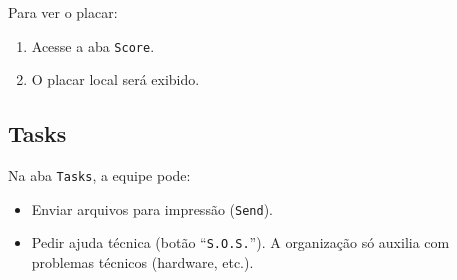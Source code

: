\documentclass{article}
\begin{document}
\begin{titlepage}
Para ver o placar:

\begin{enumerate}
    \item Acesse a aba \texttt{Score}.
    \item O placar local será exibido.
\end{enumerate}

\subsection{Tasks}

Na aba \texttt{Tasks}, a equipe pode:

\begin{itemize}
    \item Enviar arquivos para impressão (\texttt{Send}).
    \item Pedir ajuda técnica (botão ``\texttt{S.O.S.}''). A organização só auxilia com problemas técnicos (hardware, etc.).
\end{itemize}

\end{titlepage}
\end{document}

